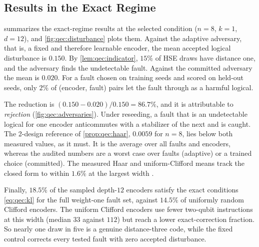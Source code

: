 \subsection{Results in the Exact Regime}\label{sec:qec:results513}

 summarizes the exact-regime results at the selected condition ($n=8$, $k=1$, $d=12$), and \cref{fig:qec:disturbance} plots them. Against the adaptive adversary, that is, a fixed and therefore learnable encoder, the mean accepted logical disturbance is $0.150$. By \cref{lem:qec:indicator}, $15\%$ of HSE draws have distance one, and the adversary finds the undetectable fault. Against the committed adversary the mean is $0.020$. For a fault chosen on training seeds and scored on held-out seeds, only $2\%$ of (encoder, fault) pairs let the fault through as a harmful logical.

The reduction is $(0.150-0.020)/0.150=86.7\%$, and it is attributable to \emph{rejection} (\cref{fig:qec:adversaries}). Under reseeding, a fault that is an undetectable logical for one encoder anticommutes with a stabilizer of the next and is caught. The 2-design reference of \cref{prop:qec:haar}, $0.0059$ for $n=8$, lies below both measured values, as it must. It is the average over all faults and encoders, whereas the audited numbers are a worst case over faults (adaptive) or a trained choice (committed). The measured Haar and uniform-Clifford means track the closed form to within $1.6\%$ at the largest width \cite{guo2026qecaudit}.

Finally, $18.5\%$ of the sampled depth-$12$ encoders satisfy the exact conditions \cref{eq:qec:kl} for the full weight-one fault set, against $14.5\%$ of uniformly random Clifford encoders. The uniform Clifford encoders use fewer two-qubit instructions at this width (median $33$ against $112$) but reach a lower exact-correction fraction. So nearly one draw in five is a genuine distance-three code, while the fixed  control corrects every tested fault with zero accepted disturbance.

